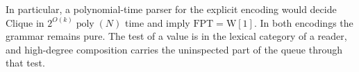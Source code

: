 \documentclass[11pt]{article}
\newcommand{\FPT}{\mathrm{FPT}}
\newcommand{\Wone}{\mathrm{W}[1]}
\begin{document}
In particular, a polynomial-time parser for the explicit encoding would decide Clique in \(2^{O(k)}\operatorname{poly}(N)\) time and imply \(\FPT=\Wone\). In both encodings the grammar remains pure. The test of a value is in the lexical category of a reader, and high-degree composition carries the uninspected part of the queue through that test.

\clearpage
\printbibliography
\end{document}
